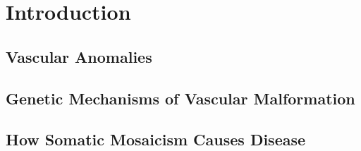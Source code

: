 \chapter{Introduction}
\label{chap:intro}

\clearpage

\section{Vascular Anomalies}

\section{Genetic Mechanisms of Vascular Malformation}

\section{How Somatic Mosaicism Causes Disease}
